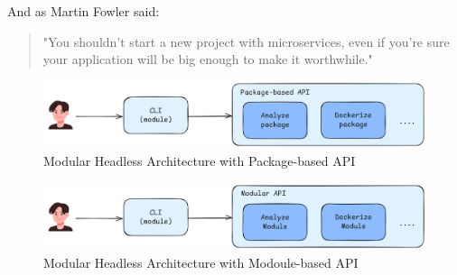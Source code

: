 \documentclass{article}
\begin{document}
\begin{multicols}{2}
And as Martin Fowler said: \begin{quote}
    "You shouldn't start a new project with microservices, even if you're sure your application will be big enough to make it worthwhile."
\end{quote}

\begin{figure}[H]
    \centering
    \includegraphics[width=\linewidth]{images/modular-headless-architecture-level-1.png}
    \caption{Modular Headless Architecture with Package-based API}
    \label{fig:modular-headless-architecture-level-1}
\end{figure}

\begin{figure}[H]
    \centering
    \includegraphics[width=\linewidth]{images/modular-headless-architecture-level-2.png}
    \caption{Modular Headless Architecture with Modoule-based API}
    \label{fig:modular-headless-architecture-level-2}
\end{figure}


\end{multicols}
\end{document}
